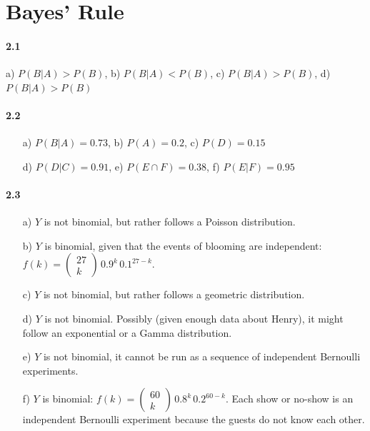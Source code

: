 \documentclass[fontsize=11pt,DIV=18,parskip=half]{scrartcl}
\begin{document}
\setcounter{section}{1}

\section{Bayes' Rule}

\paragraph{2.1} a) $P(B|A) > P(B)$, b) $P(B|A) < P(B)$, c) $P(B|A) > P(B)$, d) $P(B|A) > P(B)$

\paragraph{2.2} 
\begin{itemize}
\item[] a) $P(B|A) = 0.73$, b) $P(A) = 0.2$, c) $P(D) = 0.15$
\item[] d) $P(D|C) = 0.91$, e) $P(E \cap F) = 0.38$, f) $P(E|F) = 0.95$
\end{itemize}

\paragraph{2.3} 

\begin{enumerate}
\item[a)] $Y$ is not binomial, but rather follows a Poisson distribution.
\item[b)] $Y$ is binomial, given that the events of blooming are independent: $f(k) = \begin{pmatrix} 27 \\ k \end{pmatrix} \, 0.9^k \, 0.1^{27-k}$.
\item[c)] $Y$ is not binomial, but rather follows a geometric distribution.
\item[d)] $Y$ is not binomial. Possibly (given enough data about Henry), it might follow an exponential or a Gamma distribution.
\item[e)] $Y$ is not binomial, it cannot be run as a sequence of independent Bernoulli experiments.
\item[f)] $Y$ is binomial: $f(k) = \begin{pmatrix} 60 \\ k \end{pmatrix} \, 0.8^k \, 0.2^{60-k}$. Each show or no-show is an independent Bernoulli experiment because the guests do not know each other.
\end{enumerate}
\end{document}
